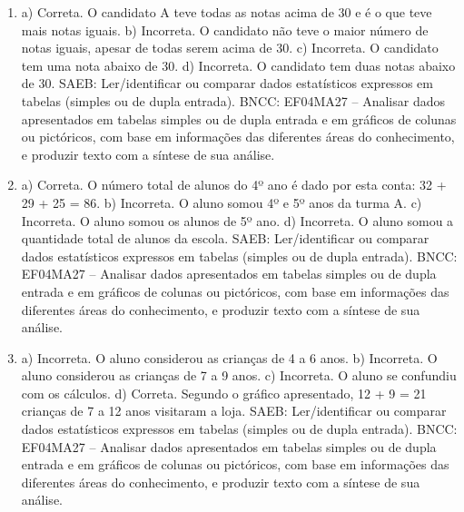 \begin{enumerate}
\item
a) Correta. O candidato A teve todas as notas acima de 30 e é o que teve mais notas iguais.
b) Incorreta. O candidato não teve o maior número de notas iguais, apesar de todas serem acima de 30.
c) Incorreta. O candidato tem uma nota abaixo de 30.
d) Incorreta. O candidato tem duas notas abaixo de 30.
SAEB: Ler/identificar ou comparar dados estatísticos expressos em tabelas (simples ou de dupla entrada).
BNCC: EF04MA27 -- Analisar dados apresentados em tabelas simples ou de dupla entrada e em gráficos de
colunas ou pictóricos, com base em informações das diferentes áreas do conhecimento, e produzir
texto com a síntese de sua análise.

\item
a)  Correta. O número total de alunos do 4º ano é dado por esta conta: 32 + 29 + 25 = 86.
b)  Incorreta. O aluno somou 4º e 5º anos da turma A.
c)  Incorreta. O aluno somou os alunos de 5º ano.
d)  Incorreta. O aluno somou a quantidade total de alunos da escola.
SAEB: Ler/identificar ou comparar dados estatísticos expressos em tabelas (simples ou de dupla entrada).
BNCC: EF04MA27 -- Analisar dados apresentados em tabelas simples ou de dupla entrada e em gráficos de
colunas ou pictóricos, com base em informações das diferentes áreas do conhecimento, e produzir
texto com a síntese de sua análise.

\item
a)  Incorreta. O aluno considerou as crianças de 4 a 6 anos.
b)  Incorreta. O aluno considerou as crianças de 7 a 9 anos.
c)  Incorreta. O aluno se confundiu com os cálculos.
d)  Correta. Segundo o gráfico apresentado, 12 + 9 = 21 crianças de 7 a 12 anos visitaram a loja.
SAEB: Ler/identificar ou comparar dados estatísticos expressos em tabelas (simples ou de dupla entrada).
BNCC: EF04MA27 -- Analisar dados apresentados em tabelas simples ou de dupla entrada e em gráficos de
colunas ou pictóricos, com base em informações das diferentes áreas do conhecimento, e produzir
texto com a síntese de sua análise.
\end{enumerate}


